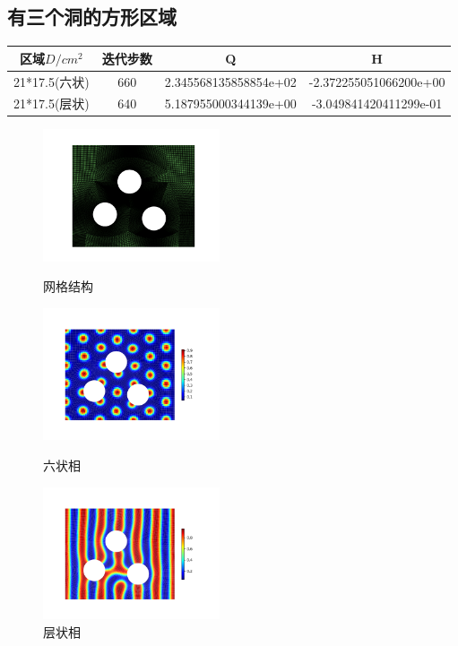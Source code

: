 \documentclass[12pt]{article}
\begin{document}
\begin{CJK}{UTF8}{gkai}
 \subsection{有三个洞的方形区域}   
    \begin{table}[H]
    		\centering
    	\begin{tabular}{cccc}
    		\toprule
    		区域$D/cm^2$ &	迭代步数 & Q &  H \\
    		\midrule
    		21*17.5(六状)&660 &2.345568135858854e+02&-2.372255051066200e+00\\
    				21*17.5(层状)&640& 5.187955000344139e+00 & -3.049841420411299e-01\\
    		\bottomrule
    	\end{tabular}
    \end{table}
      
\begin{figure}[H]
 \setlength{\abovecaptionskip}{0.cm}
 \setlength{\belowcaptionskip}{-0.cm}
 \begin{minipage}[!htbp]{0.3\linewidth}
 	\includegraphics[width=5.2cm]{Figure_11.png}
 	\caption*{网格结构}
 \end{minipage}
 \hspace{0.23in}
 \begin{minipage}[!htbp]{0.3\linewidth}
 	\includegraphics[width=5.2cm]{scftfigure640.png}
 	\caption*{六状相}
 \end{minipage}
 	\hspace{0.23in}
 	\begin{minipage}[!htbp]{0.3\linewidth}
 		\includegraphics[width=5.2cm]{scftfigure.png}
 		\caption*{层状相}
 	\end{minipage}
 \end{figure}     


\end{CJK}
\end{document}

